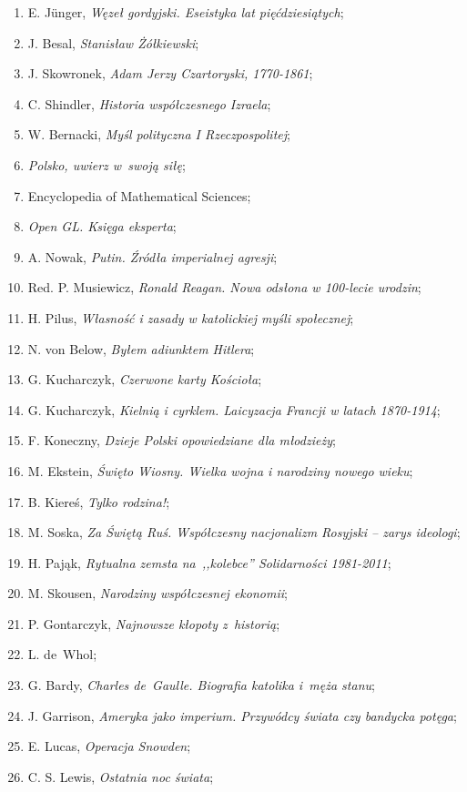 \documentclass[a4paper,11pt]{article}
\begin{document}
\begin{enumerate}
\item E. J\"{u}nger, \emph{Węzeł gordyjski. Eseistyka lat
    pięćdziesiątych};
\item J. Besal, \emph{Stanisław Żółkiewski};
\item J. Skowronek, \emph{Adam Jerzy Czartoryski, 1770-1861};
\item C. Shindler, \emph{Historia współczesnego Izraela};
\item W. Bernacki, \emph{Myśl polityczna I Rzeczpospolitej};
\item \emph{Polsko, uwierz w~swoją siłę};
\item Encyclopedia of Mathematical Sciences;
\item \emph{Open GL. Księga eksperta};
\item A. Nowak, \emph{Putin. Źródła imperialnej agresji};
\item Red. P. Musiewicz, \emph{Ronald Reagan. Nowa odsłona w 100-lecie
    urodzin};
\item H. Pilus, \emph{Własność i zasady w katolickiej myśli
    społecznej};
\item N. von Below, \emph{Byłem adiunktem Hitlera};
\item G. Kucharczyk, \emph{Czerwone karty Kościoła};
\item G. Kucharczyk, \emph{Kielnią i cyrklem. Laicyzacja Francji w
    latach 1870-1914};
\item F. Koneczny, \emph{Dzieje Polski opowiedziane dla młodzieży};
\item M. Ekstein, \emph{Święto Wiosny. Wielka wojna i narodziny nowego
    wieku};
\item B. Kiereś, \emph{Tylko rodzina!};
\item M. Soska, \emph{Za Świętą Ruś. Współczesny nacjonalizm Rosyjski
    -- zarys ideologi};
\item H. Pająk, \emph{Rytualna zemsta na~,,kolebce'' Solidarności
    1981-2011};
\item M. Skousen, \emph{Narodziny współczesnej ekonomii};
\item P. Gontarczyk, \emph{Najnowsze kłopoty z~historią};
\item L. de~Whol;
\item G. Bardy, \emph{Charles de~Gaulle. Biografia katolika i~męża
    stanu};
\item J. Garrison, \emph{Ameryka jako imperium. Przywódcy świata czy
    bandycka potęga};
\item E. Lucas, \emph{Operacja Snowden};
\item C. S. Lewis, \emph{Ostatnia noc świata};

\end{enumerate}
\end{document}
